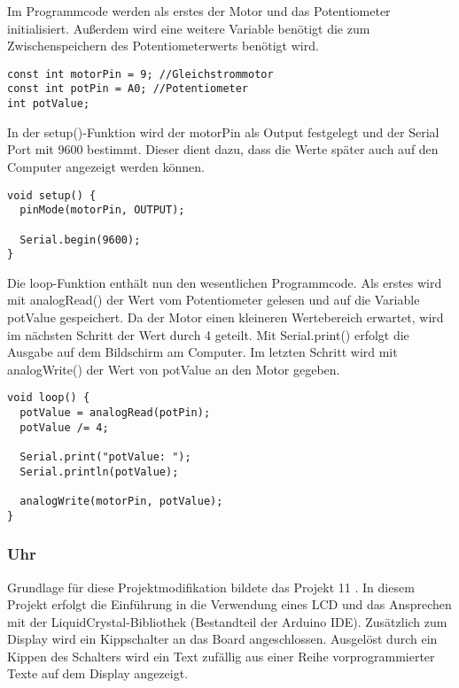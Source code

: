 Im Programmcode werden als erstes der Motor und das Potentiometer initialisiert. Außerdem wird eine weitere Variable benötigt die zum Zwischenspeichern des Potentiometerwerts benötigt wird.
\begin{lstlisting}[language=Arduino]
const int motorPin = 9; //Gleichstrommotor
const int potPin = A0; //Potentiometer
int potValue;
\end{lstlisting}

In der setup()-Funktion wird der motorPin als Output festgelegt und der Serial Port mit 9600 bestimmt. Dieser dient dazu, dass die Werte später auch auf den Computer angezeigt werden können.
\begin{lstlisting}[language=Arduino]
void setup() {
  pinMode(motorPin, OUTPUT);

  Serial.begin(9600);
}
\end{lstlisting}

Die loop-Funktion enthält nun den wesentlichen Programmcode. Als erstes wird mit analogRead() der Wert vom Potentiometer gelesen und auf die Variable potValue gespeichert. Da der Motor einen kleineren Wertebereich erwartet, wird im nächsten Schritt der Wert durch 4 geteilt. Mit Serial.print() erfolgt die Ausgabe auf dem Bildschirm am Computer. Im letzten Schritt wird mit analogWrite() der Wert von potValue an den Motor gegeben.
\begin{lstlisting}[language=Arduino]
void loop() {
  potValue = analogRead(potPin);
  potValue /= 4;

  Serial.print("potValue: ");
  Serial.println(potValue);

  analogWrite(motorPin, potValue);
}
\end{lstlisting}


\subsubsection{Uhr}
Grundlage für diese Projektmodifikation bildete das Projekt 11 \autocite{arduino}. In diesem Projekt erfolgt die Einführung in die Verwendung eines LCD und das Ansprechen mit der LiquidCrystal-Bibliothek (Bestandteil der Arduino IDE).
Zusätzlich zum Display wird ein Kippschalter an das Board angeschlossen. Ausgelöst durch ein Kippen des Schalters wird ein Text zufällig aus einer Reihe vorprogrammierter Texte auf dem Display angezeigt.

